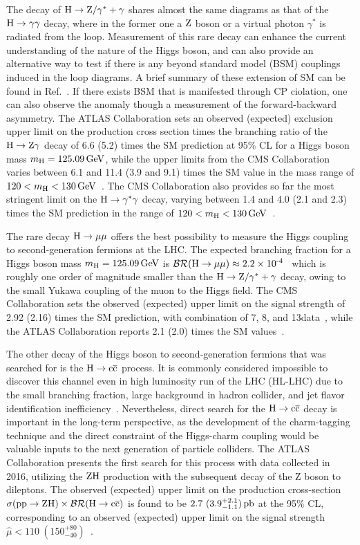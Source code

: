 The decay of $\mathrm{H}\to\mathrm{Z}/\gamma^{*}+\gamma$ shares almost the same diagrams as that of the $\mathrm{H}\to\gamma\gamma$ decay, where in the former one a $\mathrm{Z}$ boson or a virtual photon $\gamma^{*}$ is radiated from the loop. Measurement of this rare decay can enhance the current understanding of the nature of the Higgs boson, and can also provide an alternative way to test if there is any beyond standard model (BSM) couplings induced in the loop diagrams. A brief summary of these extension of SM can be found in Ref.~\cite{Sirunyan:2018tbk,Aaboud:2017uhw}. If there exists BSM that is manifested through CP ciolation, one can also observe the anomaly though a measurement of the forward-backward asymmetry. The ATLAS Collaboration sets an observed (expected) exclusion upper limit on the production cross section times the branching ratio of the $\mathrm{H}\to\mathrm{Z}\gamma$ decay of 6.6 (5.2) times the SM prediction at 95\% CL for a Higgs boson mass $m_{\mathrm{H}}=125.09\,\text{Ge\hspace{-.08em}V}$, while the upper limits from the CMS Collaboration varies between 6.1 and 11.4 (3.9 and 9.1) times the SM value in the mass range of $120<m_{\mathrm{H}}<130\,\text{Ge\hspace{-.08em}V}$~\cite{Sirunyan:2018tbk,Aaboud:2017uhw}. The CMS Collaboration also provides so far the most stringent limit on the $\mathrm{H}\to\gamma^{*}\gamma$ decay, varying between 1.4 and 4.0 (2.1 and 2.3) times the SM prediction in the range of $120<m_{\mathrm{H}}<130\,\text{Ge\hspace{-.08em}V}$~\cite{Sirunyan:2018tbk}.

The rare decay $\mathrm{H}\to\mu\mu$ offers the best possibility to measure the Higgs coupling to second-generation fermions at the LHC. The expected branching fraction for a Higgs boson mass $m_{\mathrm{H}}=125.09\,\text{Ge\hspace{-.08em}V}$ is $\mathcal{BR}(\mathrm{H}\to\mu\mu)\approx 2.2\times \text{10}^\text{-4}$~\cite{deFlorian:2016spz} which is roughly one order of magnitude smaller than the $\mathrm{H}\to\mathrm{Z}/\gamma^{*}+\gamma$ decay, owing to the small Yukawa coupling of the muon to the Higgs field. The CMS Collaboration sets the observed (expected) upper limit on the signal strength of 2.92 (2.16) times the SM prediction, with combination of 7, 8, and 13\TeV data~\cite{Sirunyan:2018hbu}, while the ATLAS Collaboration reports 2.1 (2.0) times the SM values~\cite{ATLAS-CONF-2018-026}.

The other decay of the Higgs boson to second-generation fermions that was searched for is the $\mathrm{H}\to\mathrm{c}\overline{\mathrm{c}}$ process. It is commonly considered impossible to discover this channel even in high luminosity run of the LHC (HL-LHC) due to the small branching fraction, large background in hadron collider, and jet flavor identification inefficiency~\cite{Perez:2015aoa,Perez:2015lra}. Nevertheless, direct search for the $\mathrm{H}\to\mathrm{c}\overline{\mathrm{c}}$ decay is important in the long-term perspective, as the development of the charm-tagging technique and the direct constraint of the Higgs-charm coupling would be valuable inputs to the next generation of particle colliders. The ATLAS Collaboration presents the first search for this process with data collected in 2016, utilizing the $\mathrm{Z}\mathrm{H}$ production with the subsequent decay of the Z boson to dileptons. The observed (expected) upper limit on the production cross-section $\sigma(\mathrm{p}\mathrm{p}\to\mathrm{Z}\mathrm{H})\times\mathcal{BR}(\mathrm{H}\to\mathrm{c}\overline{\mathrm{c}})$ is found to be $2.7\ (3.9^{+2.1}_{-1.1})\pb$ at the 95\% CL, corresponding to an observed (expected) upper limit on  the signal strength $\hat{\mu}<110\ (150^{+80}_{-40})$~\cite{Aaboud:2018fhh}.


